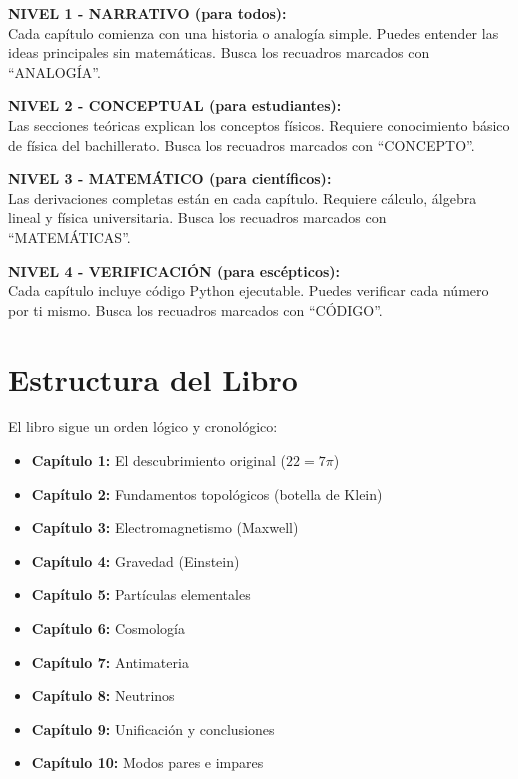 \begin{nivelnarrativo}
\textbf{NIVEL 1 - NARRATIVO (para todos):}\\
Cada capítulo comienza con una historia o analogía simple.
Puedes entender las ideas principales sin matemáticas.
Busca los recuadros marcados con ``ANALOGÍA''.
\end{nivelnarrativo}

\begin{nivelconceptual}
\textbf{NIVEL 2 - CONCEPTUAL (para estudiantes):}\\
Las secciones teóricas explican los conceptos físicos.
Requiere conocimiento básico de física del bachillerato.
Busca los recuadros marcados con ``CONCEPTO''.
\end{nivelconceptual}

\begin{nivelmatematico}
\textbf{NIVEL 3 - MATEMÁTICO (para científicos):}\\
Las derivaciones completas están en cada capítulo.
Requiere cálculo, álgebra lineal y física universitaria.
Busca los recuadros marcados con ``MATEMÁTICAS''.
\end{nivelmatematico}

\begin{nivelcodigo}
\textbf{NIVEL 4 - VERIFICACIÓN (para escépticos):}\\
Cada capítulo incluye código Python ejecutable.
Puedes verificar cada número por ti mismo.
Busca los recuadros marcados con ``CÓDIGO''.
\end{nivelcodigo}


\section*{Estructura del Libro}

El libro sigue un orden lógico y cronológico:

\begin{itemize}
    \item \textbf{Capítulo 1:} El descubrimiento original ($22 = 7\pi$)
    \item \textbf{Capítulo 2:} Fundamentos topológicos (botella de Klein)
    \item \textbf{Capítulo 3:} Electromagnetismo (Maxwell)
    \item \textbf{Capítulo 4:} Gravedad (Einstein)
    \item \textbf{Capítulo 5:} Partículas elementales
    \item \textbf{Capítulo 6:} Cosmología
    \item \textbf{Capítulo 7:} Antimateria
    \item \textbf{Capítulo 8:} Neutrinos
    \item \textbf{Capítulo 9:} Unificación y conclusiones
    \item \textbf{Capítulo 10:} Modos pares e impares
\end{itemize}

